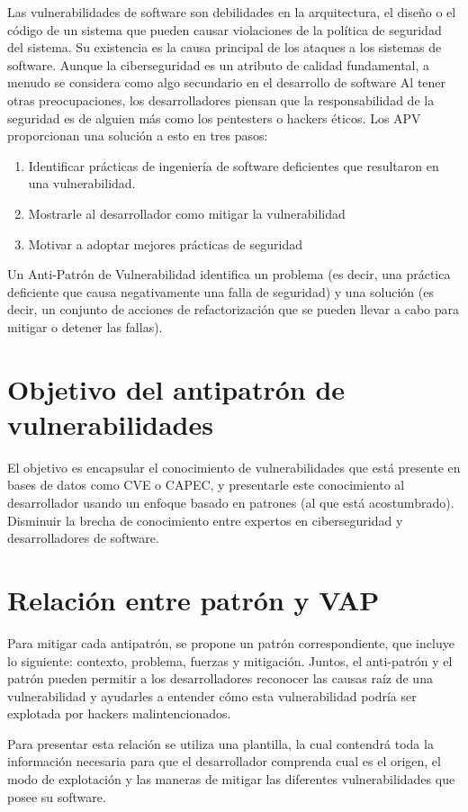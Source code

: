 Las vulnerabilidades de software son debilidades en la arquitectura, el diseño o el código de un sistema que pueden causar violaciones de la política de seguridad del sistema. Su existencia es la causa principal de los ataques a los sistemas de software. Aunque la ciberseguridad es un atributo de calidad fundamental, a menudo se considera como algo secundario en el desarrollo de software
Al tener otras preocupaciones, los desarrolladores piensan que la responsabilidad de la seguridad es de alguien más como los pentesters o hackers éticos. Los APV proporcionan una solución a esto en tres pasos:

\begin{enumerate}
    \item Identificar prácticas de ingeniería de software deficientes que resultaron en una vulnerabilidad.
    \item Mostrarle al desarrollador como mitigar la vulnerabilidad
    \item Motivar a adoptar mejores prácticas de seguridad
\end{enumerate}
Un Anti-Patrón de Vulnerabilidad identifica un problema (es decir, una práctica deficiente que causa negativamente una falla de seguridad) y una solución (es decir, un conjunto de acciones de refactorización que se pueden llevar a cabo para mitigar o detener las fallas).

\section{Objetivo del antipatrón de vulnerabilidades}
El objetivo es encapsular el conocimiento de vulnerabilidades que está presente en bases de datos como CVE o CAPEC, y presentarle este conocimiento al desarrollador usando un enfoque basado en patrones (al que está acostumbrado).
Disminuir la brecha de conocimiento entre expertos en ciberseguridad y desarrolladores de software.


\section{Relación entre patrón y VAP}
Para mitigar cada antipatrón, se propone un patrón correspondiente, que incluye lo siguiente: contexto, problema, fuerzas y mitigación. Juntos, el anti-patrón y el patrón pueden permitir a los desarrolladores reconocer las causas raíz de una vulnerabilidad y ayudarles a entender cómo esta vulnerabilidad podría ser explotada por hackers malintencionados.


Para presentar esta relación se utiliza una plantilla, la cual contendrá toda la información necesaria para que el desarrollador comprenda cual es el origen, el modo de explotación y las maneras de mitigar las diferentes vulnerabilidades que posee su software.